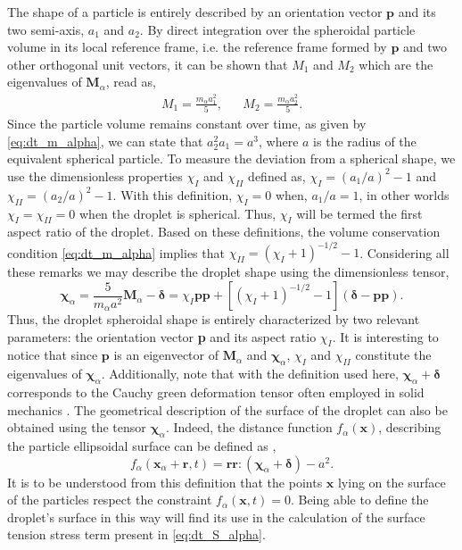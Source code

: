The shape of a particle is entirely described by an orientation vector $\textbf{p}$ and its two semi-axis, $a_1$ and $a_2$.  
By direct integration over the spheroidal particle volume in its local reference frame, i.e. the reference frame formed by $\textbf{p}$ and two other orthogonal unit vectors, it can be shown that $M_1$ and $M_2$ which are the eigenvalues of $\textbf{M}_\alpha$, read as,
\begin{align*}
    M_1 = \frac{m_\alpha a_1^2}{5},
    && M_2 = \frac{m_\alpha a_2^2}{5}.
\end{align*}
Since the particle volume remains constant over time, as given by  \ref{eq:dt_m_alpha}, we can state that $a_2^2 a_1 =a^3$, where $a$ is the radius of the equivalent spherical particle.
To measure the deviation from a spherical shape, we use the dimensionless properties $\chi_I$ and $\chi_{II}$ defined as, $\chi_I = (a_1/a)^2 - 1$ and $\chi_{II} = (a_2/a)^2 - 1$. 
With this definition, $\chi_I = 0$ when, $a_1/a =1$, in other worlds $\chi_I =\chi_{II} = 0$ when the droplet is spherical. 
Thus, $\chi_I$ will be termed the first aspect ratio of the droplet.  
Based on these definitions, the volume conservation condition \eqref{eq:dt_m_alpha} implies that $\chi_{II} = (\chi_I + 1)^{-1/2} - 1$.
Considering all these remarks we may describe the droplet shape using the dimensionless tensor, 
\begin{equation*}
    \bm\chi_\alpha
    = \frac{5}{m_\alpha a^2}\textbf{M}_\alpha - \bm\delta
    = \chi_I \textbf{pp}
        +[(\chi_I + 1)^{-1/2} - 1 ] (\bm\delta - \textbf{pp}). 
\end{equation*}
Thus, the droplet spheroidal shape is entirely characterized by two relevant parameters: the orientation vector \textbf{p} and its aspect ratio $\chi_I$.
It is interesting to notice that since $\textbf{p}$ is an eigenvector of $\textbf{M}_\alpha$ and $\bm\chi_\alpha$, $\chi_I$ and $\chi_{II}$ constitute the eigenvalues of $\bm\chi_\alpha$. 
Additionally, note that with the definition used here, $\bm\chi_\alpha +\bm\delta$ corresponds to the Cauchy green deformation tensor often employed in solid mechanics \citep{mwasame2018macroscopic}. 
The geometrical description of the surface of the droplet can also be obtained using the tensor $\bm\chi_\alpha$. 
Indeed, the distance function  $f_\alpha(\textbf{x})$, describing the particle ellipsoidal surface can be defined as \citep{nadim1996concise},  
\begin{equation*}
    f_\alpha(\textbf{x}_\alpha +\textbf{r},t) = \textbf{rr}:(\bm\chi_\alpha +\bm\delta)-a^2.  
    \label{eq:distance_function}
\end{equation*}
It is to be understood from this definition that the points $\textbf{x}$ lying on the surface of the particles respect the constraint $f_\alpha(\textbf{x},t) = 0$. 
Being able to define the droplet's surface in this way will find its use in the calculation of the surface tension stress term present in \ref{eq:dt_S_alpha}. 

